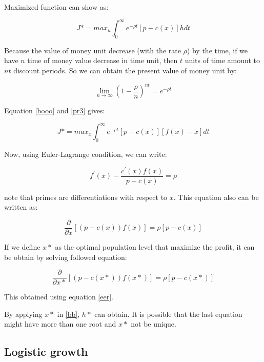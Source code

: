 Maximized function can show as:

\begin{equation}
J* = max_{h}\int_{0}^{\infty} e^{-\rho t}[p-c(x)]h dt
\end{equation}
\label{pr3}

Because the value of money unit decrease (with the rate $\rho$) by the time, if we have $n$ time of money value decrease in time unit, then $t$ units of time amount to $nt$ discount periods. So we can obtain the present value of money unit by:

\begin{equation}
\lim_{n \to \infty} (1-\frac{\rho}{n})^{nt} = e^{-\rho t}
\end{equation}

Equation \ref{booo} and \ref{pr3} gives:

\begin{equation}
J* = max_{x}\int_{0}^{\infty} e^{-\rho t}[p-c(x)][f(x)-\dot{x}] dt
\end{equation}

Now, using Euler-Lagrange condition, we can write:

\begin{equation}
f^\prime (x)-\frac{c^\prime(x)f(x)}{p-c(x)}=\rho
\end{equation}

note that primes are differentiations with respect to $x$. This equation also can be written as:

\begin{equation}
\frac{\partial}{\partial x}[(p-c(x))f(x)]=\rho[p-c(x)]
\end{equation}
\label{eer}

If we define $x*$ as the optimal population level that maximize the profit, it can be obtain by solving followed equation:

\begin{equation}
\frac{\partial}{\partial x*}[(p-c(x*))f(x*)]=\rho[p-c(x*)]
\end{equation}

This obtained using equation \ref{eer}.

By applying $x*$ in \ref{bb}, $h*$ can obtain.
It is possible that  the last equation might have more than one root and $x*$ not be unique.

\subsection{Logistic growth}

